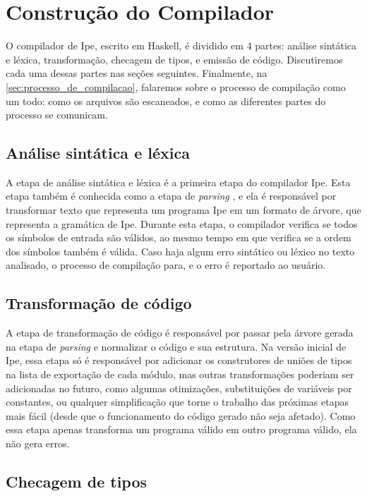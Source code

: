 

\chapter{Construção do Compilador}\label{chapter:construcao-do-compilador}

O compilador de Ipe, escrito em Haskell, é dividido em 4 partes: análise sintática e léxica,
transformação, checagem de tipos, e emissão de código. Discutiremos cada uma dessas partes nas seções
seguintes.  Finalmente, na \autoref{sec:processo_de_compilacao}, falaremos sobre o processo de
compilação como um todo: como os arquivos são escaneados, e como as diferentes partes do processo se
comunicam.

\section{Análise sintática e léxica}

A etapa de análise sintática e léxica é a primeira etapa do compilador Ipe. Esta etapa também é
conhecida como a etapa de \textit{parsing} \cite{dragonbook}, e ela é responsável por transformar texto que representa
um programa Ipe em um formato de árvore, que representa a gramática de Ipe. Durante esta etapa, o
compilador verifica se todos os símbolos de entrada são válidos, ao mesmo tempo em que verifica se a
ordem dos símbolos também é válida. Caso haja algum erro sintático ou léxico no texto analisado,
o processo de compilação para, e o erro é reportado ao usuário.


\section{Transformação de código}

A etapa de transformação de código é responsável por passar pela árvore gerada na etapa de
\textit{parsing} e normalizar o código e sua estrutura. Na versão inicial de Ipe, essa etapa só é
responsável por adicionar os construtores de uniões de tipos na lista de exportação de cada módulo,
mas outras transformações poderiam ser adicionadas no futuro, como algumas otimizações, substituições
de variáveis por constantes, ou qualquer simplificação que torne o trabalho das próximas etapas mais
fácil (desde que o funcionamento do código gerado não seja afetado). Como essa etapa apenas transforma
um programa válido em outro programa válido, ela não gera erros.

\section{Checagem de tipos}

